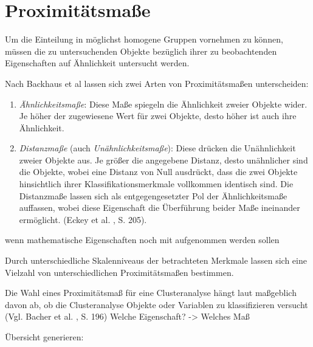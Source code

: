 \chapter{Proximitätsmaße}

Um die Einteilung in möglichst homogene Gruppen vornehmen zu können, müssen die zu untersuchenden Objekte bezüglich ihrer zu beobachtenden Eigenschaften auf Ähnlichkeit untersucht werden. 

Nach Backhaus et al \cite{Backhaus.2016} lassen sich zwei Arten von Proximitätsmaßen unterscheiden:

\begin{enumerate}
	\item \textit{Ähnlichkeitsmaße}: Diese Maße spiegeln die Ähnlichkeit zweier Objekte wider. Je höher der zugewiesene Wert für zwei Objekte, desto höher ist auch ihre Ähnlichkeit.
	\item \textit{Distanzmaße} (auch \textit{Unähnlichkeitsmaße}): Diese drücken die Unähnlichkeit zweier Objekte aus. Je größer die angegebene Distanz, desto unähnlicher sind die Objekte, wobei eine Distanz von Null ausdrückt, dass die zwei Objekte hinsichtlich ihrer Klassifikationsmerkmale vollkommen identisch sind. Die Distanzmaße lassen sich als entgegengesetzter Pol der Ähnlichkeitsmaße auffassen, wobei diese Eigenschaft die Überführung beider Maße ineinander ermöglicht. (Eckey et al. \cite{Eckey.2002}, S. 205).
\end{enumerate}

\cite{Eckey.2002} wenn mathematische Eigenschaften noch mit aufgenommen werden sollen

Durch unterschiedliche Skalenniveaus der betrachteten Merkmale lassen sich eine Vielzahl von unterschiedlichen Proximitätsmaßen bestimmen.

Die Wahl eines Proximitätsmaß für eine Clusteranalyse hängt laut maßgeblich davon ab, ob die Clusteranalyse Objekte oder Variablen zu klassifizieren versucht (Vgl. Bacher et al. \cite{Bacher.2010}, S. 196) Welche Eigenschaft? -> Welches Maß

Übersicht generieren: 

